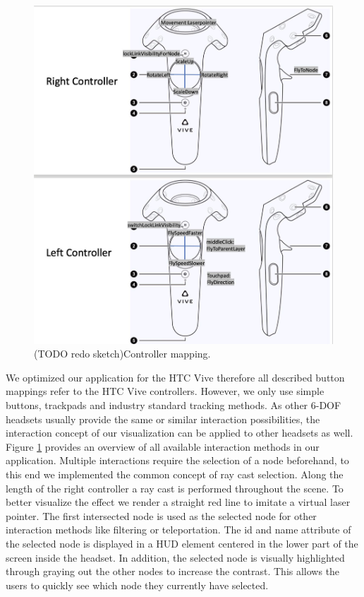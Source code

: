 \begin{figure}[h]
    \centering
    \includegraphics[width=1\textwidth]{chapters/graphics/controllerMapping.jpg}
    \caption{(TODO redo sketch)Controller mapping.} 
    \label{fig:controllerMapping} 
\end{figure}

We optimized our application for the HTC Vive therefore all described button mappings refer to the HTC Vive controllers. However, we only use simple buttons, trackpads and industry standard tracking methods. 
As other 6-DOF headsets usually provide the same or similar interaction possibilities, the interaction concept of our visualization can be applied to other headsets as well.\\
Figure \ref{fig:controllerMapping} provides an overview of all available interaction methods in our application. Multiple interactions require the selection of a node beforehand, to this end we implemented the common concept of ray cast selection. 
Along the length of the right controller a ray cast is performed throughout the scene. To better visualize the effect we render a straight red line to imitate a virtual laser pointer.
The first intersected node is used as the selected node for other interaction methods like filtering or teleportation. The id and name attribute of the selected node is displayed in a HUD element centered in the lower part of the screen inside the headset. In addition, the selected node is visually highlighted through graying out the other nodes to increase the contrast. This allows the users to quickly see which node they currently have selected.

